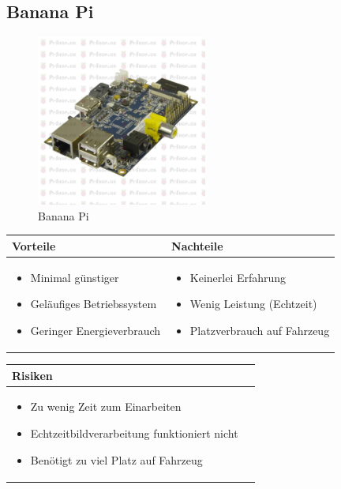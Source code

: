 \pagebreak

\subsection{Banana Pi}

\begin{figure}[h!]%
\centering
\includegraphics[width=0.5\textwidth]{fig/PIBanana.jpg}
\caption{Banana Pi}
\label{fig:Banana Pi}
\end{figure}

\begin{table}[h]
\begin{tabular}{p{} | p{}}


 \textbf{Vorteile} & \textbf{Nachteile} \\ \hline
	 
\begin{itemize}
\item Minimal günstiger
\item Geläufiges Betriebssystem
\item Geringer Energieverbrauch
\end{itemize}

 
 &
 
\begin{itemize}
\item Keinerlei Erfahrung
\item Wenig Leistung (Echtzeit)
\item Platzverbrauch auf Fahrzeug
\end{itemize}

\end{tabular}
\end{table}

\begin{table}[h]
\begin{tabular}{p{}p{}}


 \textbf{Risiken} & \\ \hline
	 
\begin{itemize}
\item Zu wenig Zeit zum Einarbeiten
\item Echtzeitbildverarbeitung funktioniert nicht
\item Benötigt zu viel Platz auf Fahrzeug
\end{itemize}

 
\end{tabular}
\end{table}

\pagebreak